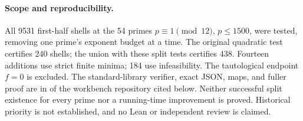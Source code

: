 \paragraph{Scope and reproducibility.}
All 9531 first-half shells at the 54 primes $p\equiv1\pmod{12}$,
$p\le1500$, were tested, removing one prime's exponent budget at a time.
The original quadratic test certifies 240 shells; the union with these
split tests certifies 438. Fourteen additions use strict finite minima;
184 use infeasibility. The tautological endpoint $f=0$ is excluded.
The standard-library verifier, exact JSON, maps, and fuller proof are in
 of the workbench
repository cited below. Neither successful split existence for every
prime nor a running-time improvement is proved. Historical priority is
not established, and no Lean or independent review is claimed.

